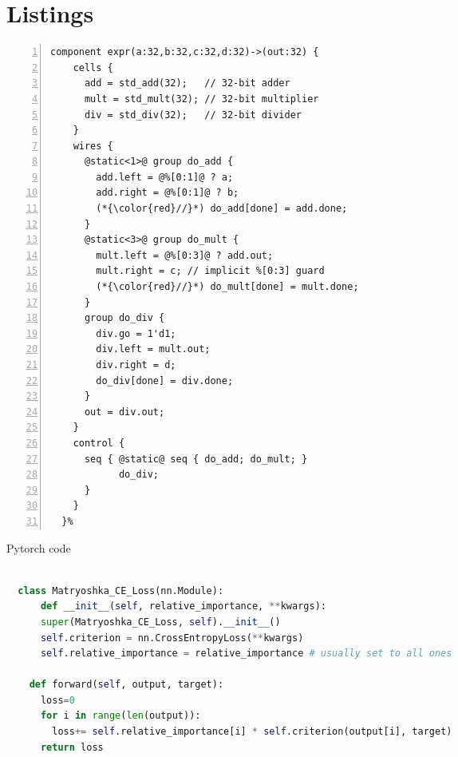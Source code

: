 \documentclass{article}
\begin{document}
\section{Listings}

\begin{lstlisting}[language=calyxspec,numbers=left, belowskip=-0.8\baselineskip]
  component expr(a:32,b:32,c:32,d:32)->(out:32) {
    cells {
      add = std_add(32);   // 32-bit adder
      mult = std_mult(32); // 32-bit multiplier
      div = std_div(32);   // 32-bit divider
    }
    wires {
      @static<1>@ group do_add {
        add.left = @%[0:1]@ ? a;
        add.right = @%[0:1]@ ? b;
        (*{\color{red}//}*) do_add[done] = add.done;
      }
      @static<3>@ group do_mult {
        mult.left = @%[0:3]@ ? add.out;
        mult.right = c; // implicit %[0:3] guard
        (*{\color{red}//}*) do_mult[done] = mult.done;
      }
      group do_div {
        div.go = 1'd1;
        div.left = mult.out;
        div.right = d;
        do_div[done] = div.done;
      }
      out = div.out;
    }
    control {
      seq { @static@ seq { do_add; do_mult; }
            do_div;
      }
    }
  }%
\end{lstlisting}


\begin{algorithm}[!h]
  \caption{\large Pytorch code} 
\begin{lstlisting}[language=Python]

  class Matryoshka_CE_Loss(nn.Module):
      def __init__(self, relative_importance, **kwargs):
      super(Matryoshka_CE_Loss, self).__init__()
      self.criterion = nn.CrossEntropyLoss(**kwargs)
      self.relative_importance = relative_importance # usually set to all ones
  
    def forward(self, output, target):
      loss=0
      for i in range(len(output)):
        loss+= self.relative_importance[i] * self.criterion(output[i], target)
      return loss
\end{lstlisting}
\end{algorithm}
\end{document}
